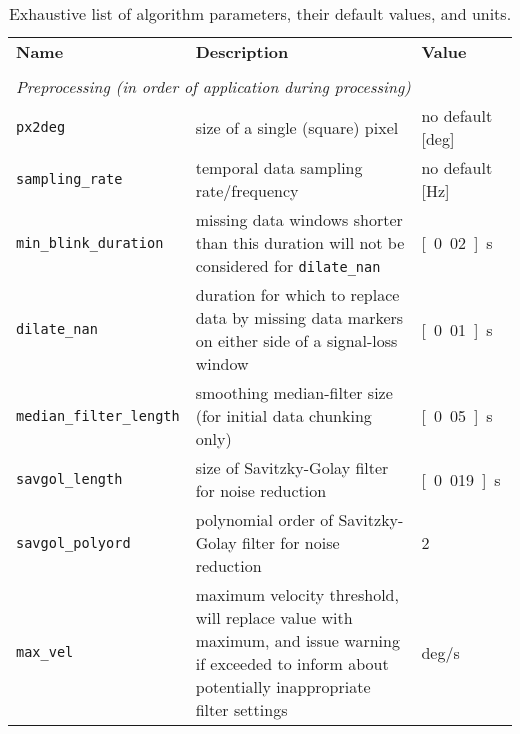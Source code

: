\begin{table*}[tbp]
  \caption{Exhaustive list of algorithm parameters, their default values, and units.}
  \label{tab:parameters}
  \small
  \begin{tabular}{lp{85mm}l}
    \textbf{Name} & \textbf{Description} & \textbf{Value} \\
    & & \\
    \multicolumn{3}{l}{\textit{Preprocessing (in order of application during processing)}} \\
    \texttt{px2deg} &
    size of a single (square) pixel &
    no default [\unit{deg}]\\
    \texttt{sampling\_rate} &
    temporal data sampling rate/frequency &
    no default [\unit{Hz}]\\
    \texttt{min\_blink\_duration} &
    missing data windows shorter than this duration will not be considered for \texttt{dilate\_nan}&
    \unit[0.02]{s}\\
    \texttt{dilate\_nan} &
    duration for which to replace data by missing data markers on either side of a
    signal-loss window &
    \unit[0.01]{s}\\
    \texttt{median\_filter\_length} &
    smoothing median-filter size (for initial data chunking only) &
    \unit[0.05]{s}\\
    \texttt{savgol\_length} &
    size of Savitzky-Golay filter for noise reduction&
    \unit[0.019]{s}\\
    \texttt{savgol\_polyord} &
    polynomial order of Savitzky-Golay filter for noise reduction&
    2\\
    \texttt{max\_vel} &
    maximum velocity threshold, will replace value with maximum, and issue
    warning if exceeded to inform about
    potentially inappropriate filter settings
    \citep[default value based on ][]{holmqvist2011eye}&
    \unit[1000]{deg/s}\\


\end{tabular}
\end{table*}
